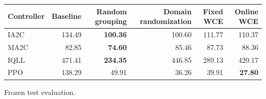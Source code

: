 \begin{tabular}{lrrrrr}
\hline
Controller & Baseline & Random grouping & Domain randomization & Fixed WCE & Online WCE \\
\hline
IA2C & 134.49 & \textbf{100.36} & 100.60 & 111.77 & 110.37 \\
MA2C & 82.85 & \textbf{74.60} & 85.46 & 87.73 & 88.36 \\
IQLL & 471.41 & \textbf{234.35} & 446.85 & 289.13 & 420.17 \\
PPO & 138.29 & 49.91 & 36.26 & 39.91 & \textbf{27.80} \\
\hline
\end{tabular}
Frozen test evaluation.
